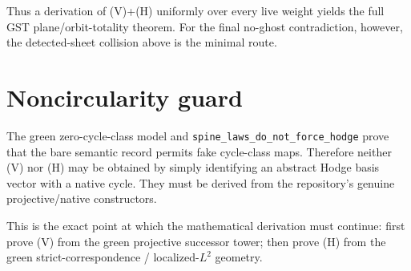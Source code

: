 \documentclass[11pt]{article}
\begin{document}
Thus a derivation of (V)+(H) uniformly over every live weight yields the full
GST plane/orbit-totality theorem.  For the final no-ghost contradiction,
however, the detected-sheet collision above is the minimal route.

\section{Noncircularity guard}

The green zero-cycle-class model and
\texttt{spine\_laws\_do\_not\_force\_hodge} prove that the bare semantic
record permits fake cycle-class maps.  Therefore neither (V) nor (H) may be
obtained by simply identifying an abstract Hodge basis vector with a native
cycle.  They must be derived from the repository's genuine projective/native
constructors.

This is the exact point at which the mathematical derivation must continue:
first prove (V) from the green projective successor tower; then prove (H) from
the green strict-correspondence / localized-$L^2$ geometry.
\end{document}
